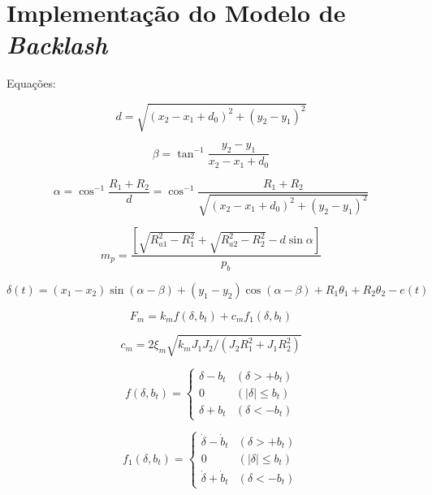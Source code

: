 \section{Implementação do Modelo de \textit{Backlash}}

Equações:

\begin{equation}
	d = \sqrt{(x_2 - x_1 + d_0)^2 + (y_2 - y_1)^2}
	\label{eq:distancia_centro}
\end{equation}

\begin{equation}
	\beta = \tan^{-1} \frac{y_2 - y_1}{x_2 - x_1 + d_0}
	\label{eq:angulo_posicao}
\end{equation}

\begin{equation}
	\alpha = \cos^{-1} \frac{R_1 + R_2}{d} = \cos^{-1} \frac{R_1 + R_2}{\sqrt{(x_2 - x_1 + d_0)^2 + (y_2 - y_1)^2}}
	\label{eq:alpha}
\end{equation}

\begin{equation}
	m_p = \frac{[\sqrt{R_{a1}^2 - R_1^2} + \sqrt{R_{a2}^2 - R_2^2} - d \sin \alpha]}{p_b}
	\label{eq:mp}
\end{equation}

\begin{equation}
	\delta(t) = (x_1 - x_2) \sin (\alpha - \beta) + (y_1 - y_2) \cos (\alpha - \beta) + R_1\theta_1 + R_2\theta_2 - e(t)
	\label{eq:delta}
\end{equation}

\begin{equation}
	F_m = k_m f(\delta, b_t) + c_m f_1(\delta, b_t)
	\label{eq:Fm}
\end{equation}

\begin{equation}
	c_m = 2\xi_m \sqrt{k_m J_1 J_2 / (J_2 R_1^2 + J_1 R_2^2)}
	\label{eq:cm}
\end{equation}

\begin{equation}
	f(\delta, b_t) = \begin{cases} 
		\delta - b_t & (\delta > +b_t) \\
		0 & (|\delta| \le b_t) \\
		\delta + b_t & (\delta < -b_t)
	\end{cases}
	\label{eq:f_delta}
\end{equation}

\begin{equation}
	f_1(\delta, b_t) = \begin{cases} 
		\dot{\delta} - \dot{b}_t & (\delta > +b_t) \\
		0 & (|\delta| \le b_t) \\
		\dot{\delta} + \dot{b}_t & (\delta < -b_t)
	\end{cases}
	\label{eq:f1_delta}
\end{equation}

